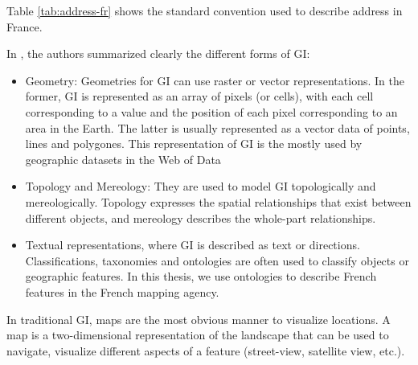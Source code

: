 Table \ref{tab:address-fr} shows the standard convention used to describe address in France. 

\begin{table}[!htbp]
\end{table}

In \cite{ldgeob2013}, the authors summarized clearly the different forms of GI:
\begin{itemize}
\item Geometry: Geometries for GI can use raster or vector representations. In the former, GI is represented as an array of pixels  (or cells), with each cell corresponding to a value and the position of each pixel corresponding to an area in the Earth. The latter is usually represented as a vector data of points, lines and polygones. This representation of GI is the mostly used by geographic datasets in the Web of Data
\item  Topology and Mereology: They are used to model GI topologically and mereologically. Topology expresses the spatial relationships that exist between different objects, and mereology describes the whole-part relationships.
\item  Textual representations, where GI is described as text or directions. Classifications, taxonomies and ontologies are often used to classify objects or geographic features. In this thesis, we use ontologies to describe French features in the French mapping agency.
\end{itemize}
	 
In traditional GI, maps are the most obvious manner to visualize locations. A map is a two-dimensional representation of the landscape that can be used to navigate, visualize different aspects of a feature (street-view, satellite view, etc.).  

